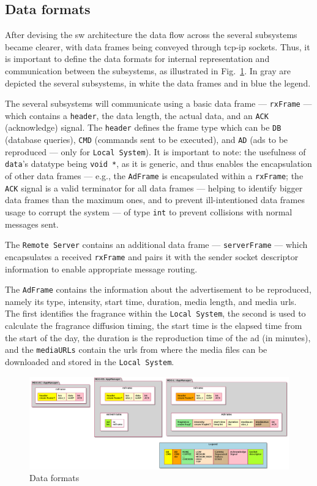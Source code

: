 \subsection{Data formats}
\label{sec:data-formats}
After devising the \gls{sw} architecture the data flow across the several
subsystems became clearer, with data frames being conveyed through \gls{tcp-ip}
sockets. Thus, it is important to define the data formats for internal
representation and communication between the subsystems, as illustrated in
Fig.~\ref{fig:data-formats}. In gray are depicted the several subsystems, in
white the data frames and in blue the legend.

The several subsystems will communicate using a basic data frame ---
\texttt{rxFrame} --- which contains a \texttt{header}, the data length, the
actual data, and an \texttt{ACK} (acknowledge) signal. The \texttt{header} defines the frame type which can be \texttt{DB}
(database queries), \texttt{CMD} (commands sent to be executed), and \texttt{AD}
(ads to be reproduced --- only for \texttt{Local System}). It is important to
note: the usefulness of \texttt{data}'s datatype being \texttt{void *}, as it is
generic, and thus enables the encapsulation of other data frames --- e.g., the
\texttt{AdFrame} is encapsulated within a \texttt{rxFrame}; the \texttt{ACK}
signal is a valid terminator for all data frames --- helping to identify bigger
data frames than the maximum ones, and to prevent ill-intentioned data frames
usage to corrupt the system --- of type \texttt{int} to prevent collisions with
normal messages sent.

The \texttt{Remote Server} contains an additional data frame ---
\texttt{serverFrame} --- which encapsulates a received \texttt{rxFrame} and
pairs it with the sender socket descriptor information to enable appropriate
message routing.

The \texttt{AdFrame} contains the information about the advertisement to be
reproduced, namely its type, intensity, start time, duration, media length, and media \glspl{url}. The
first identifies the fragrance within the \texttt{Local System}, the second is
used to calculate the fragrance diffusion timing, the start time is the elapsed
time from the start of the day, the duration is the reproduction time of the ad
(in minutes), and the \texttt{mediaURLs} contain the \glspl{url} from where the
media files can be downloaded and stored in the \texttt{Local System}.
%
\begin{figure}[htb!]
\centering
    \includegraphics[width=1.0\columnwidth]{./img/data-formats.png}
  \caption{Data formats}%
\label{fig:data-formats}
\end{figure}
%

